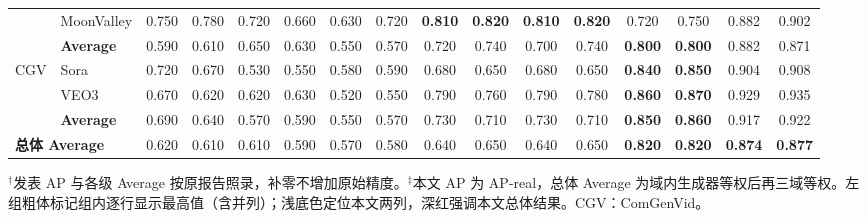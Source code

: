\begin{table}[t]
{\begin{tabular*}{\textwidth}{@{\extracolsep{\fill}}ll*{12}{c}*{2}{>{\columncolor{mainred!4}}c}@{}}
     & MoonValley & 0.750 & 0.780 & 0.720 & 0.660 & 0.630 & 0.720 & \textbf{0.810} & \textbf{0.820} & \textbf{0.810} & \textbf{0.820} & 0.720 & 0.750 & 0.882 & 0.902 \\
    \cmidrule(l){2-16}
     & \textbf{Average} & 0.590 & 0.610 & 0.650 & 0.630 & 0.550 & 0.570 & 0.720 & 0.740 & 0.700 & 0.740 & \textbf{0.800} & \textbf{0.800} & 0.882 & 0.871 \\
    \midrule
    \multirow{3}{*}{CGV} & Sora & 0.720 & 0.670 & 0.530 & 0.550 & 0.580 & 0.590 & 0.680 & 0.650 & 0.680 & 0.650 & \textbf{0.840} & \textbf{0.850} & 0.904 & 0.908 \\
     & VEO3 & 0.670 & 0.620 & 0.620 & 0.630 & 0.520 & 0.550 & 0.790 & 0.760 & 0.790 & 0.780 & \textbf{0.860} & \textbf{0.870} & 0.929 & 0.935 \\
    \cmidrule(l){2-16}
     & \textbf{Average} & 0.690 & 0.640 & 0.570 & 0.590 & 0.550 & 0.570 & 0.730 & 0.710 & 0.730 & 0.710 & \textbf{0.850} & \textbf{0.860} & 0.917 & 0.922 \\
    \midrule
    \multicolumn{2}{l}{\textbf{总体 Average}} & 0.620 & 0.610 & 0.610 & 0.590 & 0.570 & 0.580 & 0.640 & 0.650 & 0.640 & 0.650 & \textbf{0.820} & \textbf{0.820} & \textcolor{mainred}{\textbf{0.874}} & \textcolor{mainred}{\textbf{0.877}} \\
    \bottomrule
  \end{tabular*}
  \par\vspace{2pt}
  \begin{minipage}{\textwidth}\scriptsize
  $^{\dagger}$发表 AP 与各级 Average 按原报告照录，补零不增加原始精度。$^{\ddagger}$本文 AP 为 AP-real，总体 Average 为域内生成器等权后再三域等权。左组粗体标记组内逐行显示最高值（含并列）；浅底色定位本文两列，深红强调本文总体结果。CGV：ComGenVid。
  \end{minipage}}
\end{table}

